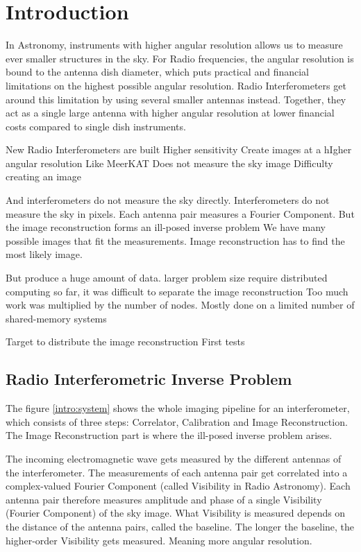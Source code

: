 \section{Introduction}
In Astronomy, instruments with higher angular resolution allows us to measure ever smaller structures in the sky. For Radio frequencies, the angular resolution is bound to the antenna dish diameter, which puts practical and financial limitations on the highest possible angular resolution. Radio Interferometers get around this limitation by using several smaller antennas instead. Together, they act as a single large antenna with higher angular resolution at lower financial costs compared to single dish instruments.

New Radio Interferometers are built
Higher sensitivity
Create images at a hIgher angular resolution
Like MeerKAT
Does not measure the sky image
Difficulty creating an image

And interferometers do not measure the sky directly. Interferometers do not measure the sky in pixels. Each antenna pair measures a Fourier Component. 
But the image reconstruction forms an ill-posed inverse problem
We have many possible images that fit the measurements.
Image reconstruction has to find the most likely image.

But produce a huge amount of data.
larger problem size require distributed computing
so far, it was difficult to separate the image reconstruction
Too much work was multiplied by the number of nodes.
Mostly done on a limited number of shared-memory systems

Target to distribute the image reconstruction
First tests


\subsection{Radio Interferometric Inverse Problem}
The figure \ref{intro:system} shows the whole imaging pipeline for an interferometer, which consists of three steps: Correlator, Calibration and Image Reconstruction. 
The Image Reconstruction part is where the ill-posed inverse problem arises.

The incoming electromagnetic wave gets measured by the different antennas of the interferometer. The measurements of each antenna pair get correlated into a complex-valued Fourier Component (called Visibility in Radio Astronomy). Each antenna pair therefore measures amplitude and phase of a single Visibility (Fourier Component) of the sky image.
What Visibility is measured depends on the distance of the antenna pairs, called the baseline. The longer the baseline, the higher-order Visibility gets measured. Meaning more angular resolution.

